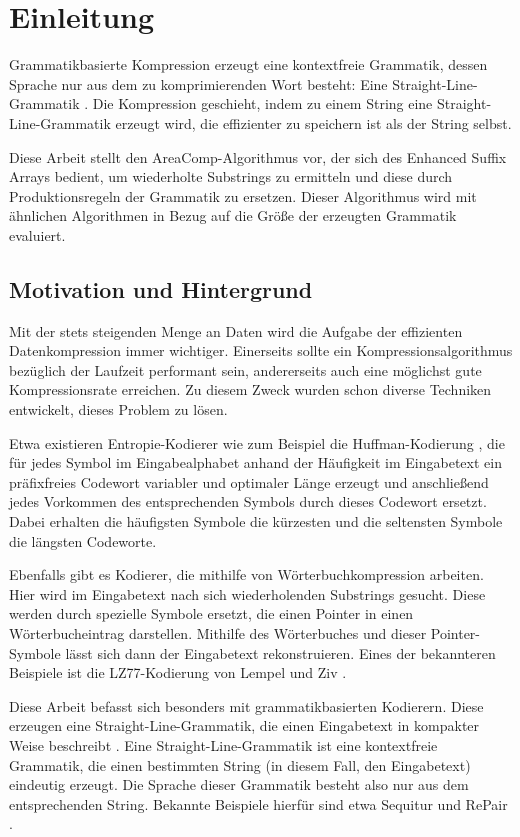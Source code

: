 \chapter{Einleitung}

Grammatikbasierte Kompression erzeugt eine kontextfreie Grammatik, dessen Sprache nur aus dem zu komprimierenden Wort besteht: Eine Straight-Line-Grammatik \cite{benz_effective_2013}. Die Kompression geschieht, indem zu einem String eine Straight-Line-Grammatik erzeugt wird, die effizienter zu speichern ist als der String selbst.

Diese Arbeit stellt den AreaComp-Algorithmus vor, der sich des Enhanced Suffix Arrays bedient, um wiederholte Substrings zu ermitteln und diese durch Produktionsregeln der Grammatik zu ersetzen.
Dieser Algorithmus wird mit ähnlichen Algorithmen in Bezug auf die Größe der erzeugten Grammatik evaluiert.

\section{Motivation und Hintergrund}

Mit der stets steigenden Menge an Daten wird die Aufgabe der effizienten Datenkompression immer wichtiger. Einerseits sollte ein Kompressionsalgorithmus bezüglich der Laufzeit performant sein, andererseits auch eine möglichst gute Kompressionsrate erreichen. 
Zu diesem Zweck wurden schon diverse Techniken entwickelt, dieses Problem zu lösen. 

Etwa existieren Entropie-Kodierer wie zum Beispiel die Huffman-Kodierung \cite{huffman_method_1952}, die für jedes Symbol im Eingabealphabet anhand der Häufigkeit im Eingabetext ein präfixfreies Codewort variabler und optimaler Länge erzeugt und anschließend jedes Vorkommen des entsprechenden Symbols durch dieses Codewort ersetzt. 
Dabei erhalten die häufigsten Symbole die kürzesten und die seltensten Symbole die längsten Codeworte.

Ebenfalls gibt es Kodierer, die mithilfe von Wörterbuchkompression arbeiten. Hier wird im Eingabetext nach sich wiederholenden Substrings gesucht. Diese werden durch spezielle Symbole ersetzt, die einen Pointer in einen Wörterbucheintrag darstellen. 
Mithilfe des Wörterbuches und dieser Pointer-Symbole lässt sich dann der Eingabetext rekonstruieren.
Eines der bekannteren Beispiele ist die LZ77-Kodierung von Lempel und Ziv \cite{ziv_universal_1977}.

Diese Arbeit befasst sich besonders mit grammatikbasierten Kodierern. Diese erzeugen eine Straight-Line-Grammatik, die einen Eingabetext in kompakter Weise beschreibt \cite{kieffer_grammar-based_2000}. 
Eine Straight-Line-Grammatik ist eine kontextfreie Grammatik, die einen bestimmten String (in diesem Fall, den Eingabetext) eindeutig erzeugt. Die Sprache dieser Grammatik besteht also nur aus dem entsprechenden String. Bekannte Beispiele hierfür sind etwa Sequitur \cite{nevill-manning_identifying_1997} und RePair \cite{larsson_offline_1999}.

